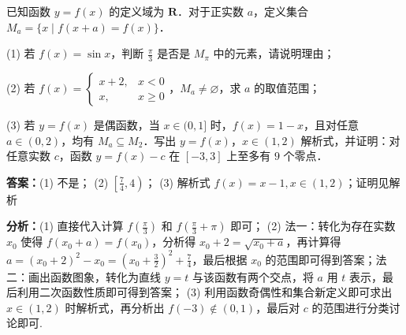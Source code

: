 \begin{question}[points=18]
已知函数 $y = f(x)$ 的定义域为 $\mathbf{R}$．对于正实数 $a$，定义集合 $M_a = \{x \mid f(x+a) = f(x)\}$．

(1) 若 $f(x) = \sin x$，判断 $\frac{\pi}{3}$ 是否是 $M_\pi$ 中的元素，请说明理由；

(2) 若 $f(x) = \begin{cases} x+2, & x < 0 \\ x, & x \geq 0 \end{cases}$，$M_a \neq \varnothing$，求 $a$ 的取值范围；

(3) 若 $y = f(x)$ 是偶函数，当 $x \in (0,1]$ 时，$f(x) = 1 - x$，且对任意 $a \in (0,2)$，均有 $M_a \subseteq M_2$．写出 $y = f(x)$，$x \in (1,2)$ 解析式，并证明：对任意实数 $c$，函数 $y = f(x) - c$ 在 $[-3,3]$ 上至多有 $9$ 个零点．
\begin{solution}
\textbf{答案：}(1) 不是； (2) $\left[\frac{7}{4}, 4\right)$； (3) 解析式 $f(x) = x - 1, x \in (1,2)$；证明见解析

\textbf{分析：}(1) 直接代入计算 $f\left(\frac{\pi}{3}\right)$ 和 $f\left(\frac{\pi}{3} + \pi\right)$ 即可； (2) 法一：转化为存在实数 $x_0$ 使得 $f(x_0 + a) = f(x_0)$，分析得 $x_0 + 2 = \sqrt{x_0 + a}$，再计算得 $a = (x_0 + 2)^2 - x_0 = \left(x_0 + \frac{3}{2}\right)^2 + \frac{7}{4}$，最后根据 $x_0$ 的范围即可得到答案；法二：画出函数图象，转化为直线 $y = t$ 与该函数有两个交点，将 $a$ 用 $t$ 表示，最后利用二次函数性质即可得到答案； (3) 利用函数奇偶性和集合新定义即可求出 $x \in (1,2)$ 时解析式，再分析出 $f(-3) \notin (0,1)$，最后对 $c$ 的范围进行分类讨论即可.


\end{solution}
\end{question}
